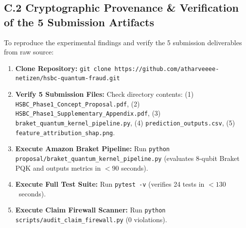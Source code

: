 \documentclass[10pt,a4paper]{article}
\begin{document}
\subsection*{C.2 Cryptographic Provenance \& Verification of the 5 Submission Artifacts}
To reproduce the experimental findings and verify the 5 submission deliverables from raw source:
\begin{enumerate}[leftmargin=*,itemsep=0.4pt,topsep=1pt]
\item \textbf{Clone Repository:} \texttt{git clone https://github.com/atharveeee-netizen/hsbc-quantum-fraud.git}
\item \textbf{Verify 5 Submission Files:} Check directory contents: (1) \texttt{HSBC\_Phase1\_Concept\_Proposal.pdf}, (2) \texttt{HSBC\_Phase1\_Supplementary\_Appendix.pdf}, (3) \texttt{braket\_quantum\_kernel\_pipeline.py}, (4) \texttt{prediction\_outputs.csv}, (5) \texttt{feature\_attribution\_shap.png}.
\item \textbf{Execute Amazon Braket Pipeline:} Run \texttt{python proposal/braket\_quantum\_kernel\_pipeline.py} (evaluates 8-qubit Braket PQK and outputs metrics in $<90$ seconds).
\item \textbf{Execute Full Test Suite:} Run \texttt{pytest -v} (verifies 24 tests in $<130$~seconds).
\item \textbf{Execute Claim Firewall Scanner:} Run \texttt{python scripts/audit\_claim\_firewall.py} (0 violations).
\end{enumerate}
\end{document}
